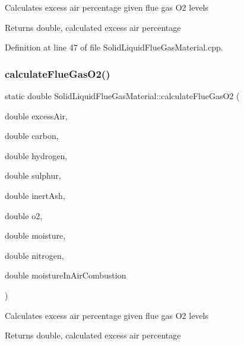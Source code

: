 Calculates excess air percentage given flue gas O2 levels \begin{DoxyReturn}{Returns}
double, calculated excess air percentage 
\end{DoxyReturn}


Definition at line 47 of file Solid\+Liquid\+Flue\+Gas\+Material.\+cpp.

\mbox{\label{class_solid_liquid_flue_gas_material_a33152fce2511a4db7240461a7de950a5}} 
\subsubsection{\texorpdfstring{calculate\+Flue\+Gas\+O2()}{calculateFlueGasO2()}\hspace{0.1cm}{\footnotesize\ttfamily [2/3]}}
{\footnotesize\ttfamily static double Solid\+Liquid\+Flue\+Gas\+Material\+::calculate\+Flue\+Gas\+O2 (\begin{DoxyParamCaption}\item[{double}]{excess\+Air,  }\item[{double}]{carbon,  }\item[{double}]{hydrogen,  }\item[{double}]{sulphur,  }\item[{double}]{inert\+Ash,  }\item[{double}]{o2,  }\item[{double}]{moisture,  }\item[{double}]{nitrogen,  }\item[{double}]{moisture\+In\+Air\+Combustion }\end{DoxyParamCaption})\hspace{0.3cm}{\ttfamily [static]}}

Calculates excess air percentage given flue gas O2 levels \begin{DoxyReturn}{Returns}
double, calculated excess air percentage 
\end{DoxyReturn}
\mbox{\label{class_solid_liquid_flue_gas_material_a33152fce2511a4db7240461a7de950a5}} 
